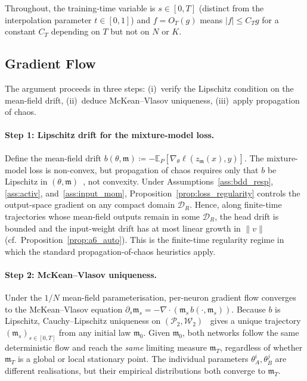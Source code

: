 \documentclass[11pt]{article}
\newcommand{\E}{\mathbb{E}}
\newcommand{\cW}{\mathcal{W}}
\newcommand{\cB}{\mathcal{B}}
\newcommand{\cD}{\mathcal{D}}  %
\begin{document}
Throughout, the training-time variable is $s \in [0,T]$
(distinct from the interpolation parameter $t \in [0,1]$) and
$f = O_T(g)$ means $|f| \le C_T g$ for a constant $C_T$ depending
on $T$ but not on $N$ or $K$.

\subsection{Gradient Flow}\label{app:mf_gf}

The argument proceeds in three steps: (i)~verify the Lipschitz
condition on the mean-field drift, (ii)~deduce McKean--Vlasov uniqueness,
(iii)~apply propagation of chaos.

\paragraph{Step 1: Lipschitz drift for the mixture-model loss.}
Define the mean-field drift
$b(\theta,\mathfrak{m})
\coloneqq -\E_P[\nabla_\theta\ell(z_{\mathfrak{m}}(x),y)]$.
The mixture-model loss is non-convex, but propagation of chaos requires only
that $b$ be Lipschitz in
$(\theta,\mathfrak{m})$~\cite{mei2018meanfield,rotskoff2022},
not convexity.
Under Assumptions~\ref{ass:bdd_resp}, \ref{ass:activ},
and~\ref{ass:input_mom}, Proposition~\ref{prop:loss_regularity}
controls the output-space gradient on any compact domain $\cD_R$.
Hence, along finite-time trajectories whose mean-field outputs remain
in some $\cD_R$, the head drift is bounded and the input-weight drift
has at most linear growth in $\|v\|$
(cf.~Proposition~\ref{prop:a6_auto}).
This is the finite-time regularity regime in which the standard
propagation-of-chaos heuristics apply.

\paragraph{Step 2: McKean--Vlasov uniqueness.}
Under the $1/N$ mean-field parameterisation, per-neuron gradient flow
converges to the McKean--Vlasov equation
$\partial_s\mathfrak{m}_s
= -\nabla\cdot(\mathfrak{m}_s\,b(\cdot,\mathfrak{m}_s))$.
Because $b$ is Lipschitz, Cauchy--Lipschitz uniqueness on
$(\mathcal{P}_2,\cW_2)$~\cite{carmona2018probabilistic} gives a
unique trajectory $(\mathfrak{m}_s)_{s\in[0,T]}$ from any initial law
$\mathfrak{m}_0$.
Given $\mathfrak{m}_0$, both networks follow the same deterministic
flow and reach the \emph{same} limiting measure $\mathfrak{m}_T$,
regardless of whether $\mathfrak{m}_T$ is a global or local stationary
point.
The individual parameters $\theta^i_A, \theta^j_B$ are different
realisations, but their empirical distributions both converge to
$\mathfrak{m}_T$.
\end{document}
